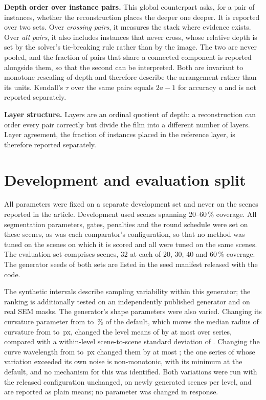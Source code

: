 \textbf{Depth order over instance pairs.} This global counterpart asks, for a
pair of instances, whether the reconstruction places the deeper one deeper. It
is reported over two sets. Over \emph{crossing pairs}, it measures the stack
where evidence exists. Over \emph{all pairs}, it also includes instances that
never cross, whose relative depth is set by the solver's tie-breaking rule
rather than by the image. The two are never pooled, and the fraction of pairs
that share a connected component is reported alongside them, so that the
second can be interpreted. Both are invariant to monotone rescaling of depth
and therefore describe the arrangement rather than its units. Kendall's
$\tau$ over the same pairs equals $2a-1$ for accuracy $a$ and is not reported
separately.

\textbf{Layer structure.} Layers are an ordinal quotient of depth: a
reconstruction can order every pair correctly but divide the film into a
different number of layers. Layer agreement, the fraction of instances placed
in the reference layer, is therefore reported separately.

\section{Development and evaluation split}
\label{app:split}

All parameters were fixed on a separate development set and never on the
scenes reported in the article. Development used \PlectaDevelopmentSceneCount{}
scenes spanning 20--60\,\% coverage. All segmentation parameters, gates,
penalties and the round schedule were set on these scenes, as was each
comparator's configuration, so that no method was tuned on the scenes on which
it is scored and all were tuned on the same scenes. The evaluation set
comprises \PlectaHeldoutSceneCount{} scenes, 32 at each of 20, 30, 40 and
60\,\% coverage. The generator seeds of both sets are listed in the seed
manifest released with the code.

The synthetic intervals describe sampling variability within this generator;
the ranking is additionally tested on an independently published generator
and on real SEM masks. The generator's shape parameters were also varied.
Changing its curvature parameter from \PlectaCurvinessSweepLow{} to
\PlectaCurvinessSweepHigh{}\,\% of the default, which moves the median
radius of curvature from \PlectaCurvinessRadiusHigh{} to
\PlectaCurvinessRadiusLow{}\,px, changed the level means of \Fone{} by at most
\PlectaCurvinessMaxSpread{} over \PlectaCurvinessSeriesCount{} series,
compared with a within-level scene-to-scene standard deviation of
\PlectaCurvinessMinSceneSD{}. Changing the curve wavelength from
\PlectaSmoothLow{} to \PlectaSmoothHigh{}\,px changed them by at most
\PlectaSmoothMaxSpread{}; the one series of \PlectaSmoothSeriesCount{} whose
variation exceeded its own noise is non-monotonic, with its minimum at the
default, and no mechanism for this was identified. Both variations were
run with the released configuration unchanged, on
\PlectaCurvinessSceneCount{} newly generated scenes per level, and are
reported as plain means; no parameter was changed in response.

